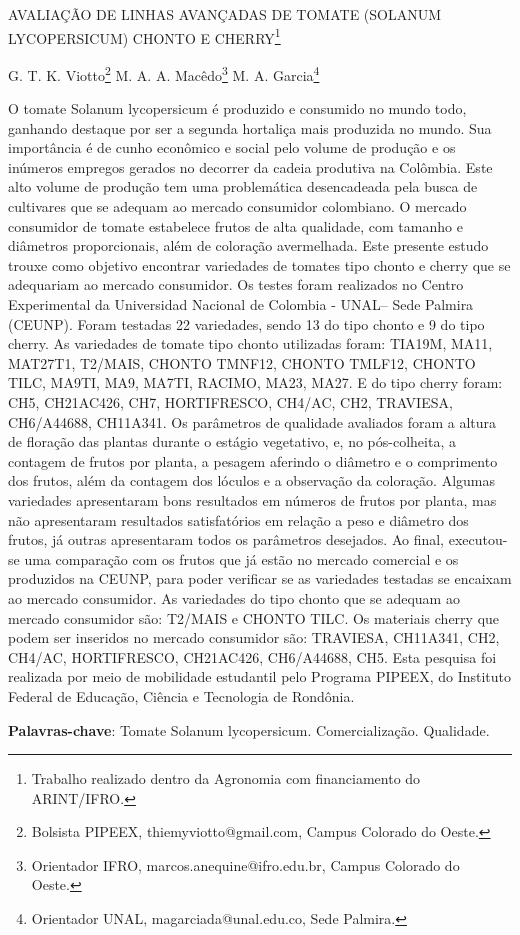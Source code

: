\documentclass[article,12pt,onesidea,4paper,english,brazil]{abntex2}
\begin{document}
	
	
	\frenchspacing 
	
	\begin{center}
		\LARGE AVALIAÇÃO DE LINHAS AVANÇADAS DE TOMATE (SOLANUM
		LYCOPERSICUM) CHONTO E CHERRY\footnote{Trabalho realizado dentro da Agronomia com financiamento do ARINT/IFRO.}
		
		\normalsize
		G. T. K. Viotto\footnote{Bolsista PIPEEX, thiemyviotto@gmail.com, Campus Colorado do Oeste.} 
		M. A. A. Macêdo\footnote{Orientador IFRO, marcos.anequine@ifro.edu.br, Campus Colorado do Oeste.} 
		M. A. Garcia\footnote{Orientador UNAL, magarciada@unal.edu.co, Sede Palmira.} 
	\end{center}
	
	\noindent O tomate Solanum lycopersicum é produzido e consumido no mundo todo, ganhando destaque por
	ser a segunda hortaliça mais produzida no mundo. Sua importância é de cunho econômico e social
	pelo volume de produção e os inúmeros empregos gerados no decorrer da cadeia produtiva na
	Colômbia. Este alto volume de produção tem uma problemática desencadeada pela busca de
	cultivares que se adequam ao mercado consumidor colombiano. O mercado consumidor de tomate
	estabelece frutos de alta qualidade, com tamanho e diâmetros proporcionais, além de coloração
	avermelhada. Este presente estudo trouxe como objetivo encontrar variedades de tomates tipo
	chonto e cherry que se adequariam ao mercado consumidor. Os testes foram realizados no Centro
	Experimental da Universidad Nacional de Colombia - UNAL– Sede Palmira (CEUNP). Foram testadas
	22 variedades, sendo 13 do tipo chonto e 9 do tipo cherry. As variedades de tomate tipo chonto
	utilizadas foram: TIA19M, MA11, MAT27T1, T2/MAIS, CHONTO TMNF12, CHONTO TMLF12, CHONTO
	TILC, MA9TI, MA9, MA7TI, RACIMO, MA23, MA27. E do tipo cherry foram: CH5, CH21AC426, CH7,
	HORTIFRESCO, CH4/AC, CH2, TRAVIESA, CH6/A44688, CH11A341. Os parâmetros de qualidade
	avaliados foram a altura de floração das plantas durante o estágio vegetativo, e, no pós-colheita, a
	contagem de frutos por planta, a pesagem aferindo o diâmetro e o comprimento dos frutos, além da
	contagem dos lóculos e a observação da coloração. Algumas variedades apresentaram bons
	resultados em números de frutos por planta, mas não apresentaram resultados satisfatórios em
	relação a peso e diâmetro dos frutos, já outras apresentaram todos os parâmetros desejados. Ao
	final, executou-se uma comparação com os frutos que já estão no mercado comercial e os
	produzidos na CEUNP, para poder verificar se as variedades testadas se encaixam ao mercado
	consumidor. As variedades do tipo chonto que se adequam ao mercado consumidor são: T2/MAIS e
	CHONTO TILC. Os materiais cherry que podem ser inseridos no mercado consumidor são: TRAVIESA,
	CH11A341, CH2, CH4/AC, HORTIFRESCO, CH21AC426, CH6/A44688, CH5. Esta pesquisa foi realizada
	por meio de mobilidade estudantil pelo Programa PIPEEX, do Instituto Federal de Educação, Ciência e
	Tecnologia de Rondônia.
	
	\vspace{\onelineskip}
	
	\noindent
	\textbf{Palavras-chave}: Tomate Solanum lycopersicum. Comercialização. Qualidade.
	
\end{document}
